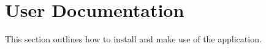\clearpage

\part{User Documentation} %
\label{prt:user_ _documentation_}
This section outlines how to install and make use of the application.



